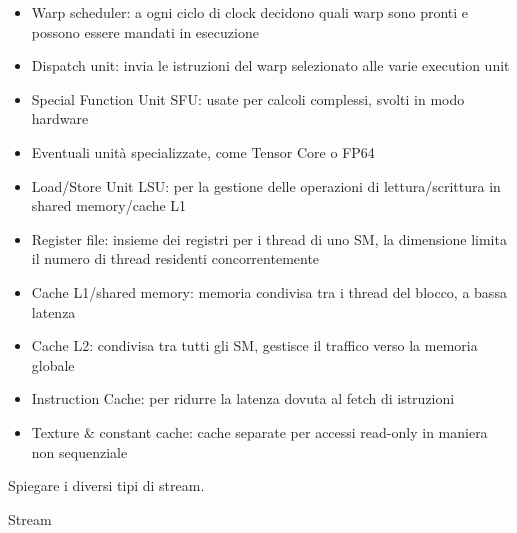 \documentclass[12pt, answers]{exam}
\begin{document}
\begin{questions}
\begin{solution}
\begin{itemize}
            \item Warp scheduler: a ogni ciclo di clock decidono quali warp sono pronti e possono essere mandati in esecuzione
            
            \item Dispatch unit: invia le istruzioni del warp selezionato alle varie execution unit
            
            \item Special Function Unit SFU: usate per calcoli complessi, svolti in modo hardware
            
            \item Eventuali unità specializzate, come Tensor Core o FP64
            
            \item Load/Store Unit LSU: per la gestione delle operazioni di lettura/scrittura in shared memory/cache L1
            
            \item Register file: insieme dei registri per i thread di uno SM, la dimensione limita il numero di thread residenti concorrentemente 
            
            \item Cache L1/shared memory: memoria condivisa tra i thread del blocco, a bassa latenza
            
            \item Cache L2: condivisa tra tutti gli SM, gestisce il traffico verso la memoria globale
            
            \item Instruction Cache: per ridurre la latenza dovuta al fetch di istruzioni
            
            \item Texture \& constant cache: cache separate per accessi read-only in maniera non sequenziale
        \end{itemize}
    \end{solution}
    
    \question Spiegare i diversi tipi di stream.
    
    \begin{solution}
        Stream
    \end{solution}
\end{questions}
\end{document}
